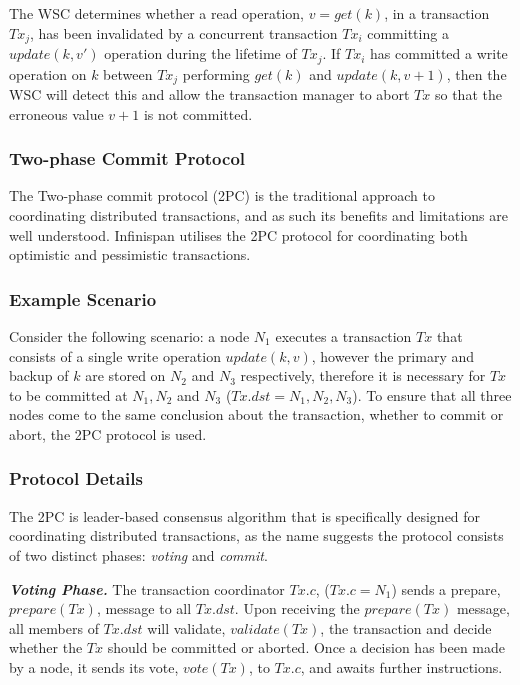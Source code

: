 	        The WSC determines whether a read operation, $v = get(k)$, in a transaction $Tx_j$, has been invalidated by a concurrent transaction $Tx_i$ committing a $update(k, v')$ operation during the lifetime of $Tx_j$.  If $Tx_i$ has committed a write operation on $k$ between $Tx_j$ performing $get(k)$ and $update(k, v+1)$, then the WSC will detect this and allow the transaction manager to abort $Tx$ so that the erroneous value $v+1$ is not committed.  

        
	    \subsubsection{Two-phase Commit Protocol}\label{ssec:2PC}
	       The Two-phase commit protocol (2PC)\citep{Bernstein:1996:PTP:261193} is the traditional approach to coordinating distributed transactions, and as such its benefits and limitations are well understood.  Infinispan utilises the 2PC protocol for coordinating both optimistic and pessimistic transactions.  
	       
           \subsubsection*{Example Scenario} \label{transaction_scenario} 
           Consider the following scenario: a node $N_1$ executes a transaction $Tx$ that consists of a single write operation $update(k, v)$, however the primary and backup of $k$ are stored on $N_2$ and $N_3$ respectively, therefore it is necessary for $Tx$ to be committed at $N_1, N_2$ and $N_3$ ($Tx.dst = N_1, N_2, N_3$).  To ensure that all three nodes come to the same conclusion about the transaction, whether to commit or abort, the 2PC protocol is used.  
	       
	       \subsubsection*{Protocol Details}
	       The 2PC is leader-based consensus algorithm that is specifically designed for coordinating distributed transactions, as the name suggests the protocol consists of two distinct phases: \emph{voting} and \emph{commit}. 
	       
	       \textbf{\emph{Voting Phase.}} The transaction coordinator $Tx.c$, ($Tx.c = N_1$) sends a prepare, $prepare(Tx)$, message to all $Tx.dst$.  Upon receiving the $prepare(Tx)$ message, all members of $Tx.dst$ will validate, $validate(Tx)$, the transaction and decide whether the $Tx$ should be committed or aborted.  Once a decision has been made by a node, it sends its vote, $vote(Tx)$, to $Tx.c$, and awaits further instructions.  
	       
